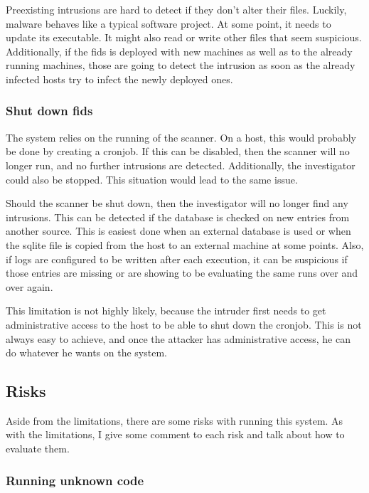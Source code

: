 Preexisting intrusions are hard to detect if they don't alter their files. Luckily, malware behaves like a typical software project. At some point, it needs to update its executable. It might also read or write other files that seem suspicious. Additionally, if the \gls{fids} is deployed with new machines as well as to the already running machines, those are going to detect the intrusion as soon as the already infected hosts try to infect the newly deployed ones.

\subsubsection{Shut down \gls{fids}}
\label{sec:limitation:noscan}
The system relies on the running of the scanner. On a host, this would probably be done by creating a cronjob. If this can be disabled, then the scanner will no longer run, and no further intrusions are detected. Additionally, the investigator could also be stopped. This situation would lead to the same issue.

Should the scanner be shut down, then the investigator will no longer find any intrusions. This can be detected if the database is checked on new entries from another source. This is easiest done when an external database is used or when the \gls{sqlite} file is copied from the host to an external machine at some points. Also, if logs are configured to be written after each execution, it can be suspicious if those entries are missing or are showing to be evaluating the same runs over and over again. 

This limitation is not highly likely, because the intruder first needs to get administrative access to the host to be able to shut down the cronjob. This is not always easy to achieve, and once the attacker has administrative access, he can do whatever he wants on the system. 

\subsection{Risks}
\label{sec:risk}

Aside from the limitations, there are some risks with running this system. As with the limitations, I give some comment to each risk and talk about how to evaluate them.

\subsubsection{Running unknown code}
\label{sec:risk:unknowncode}

